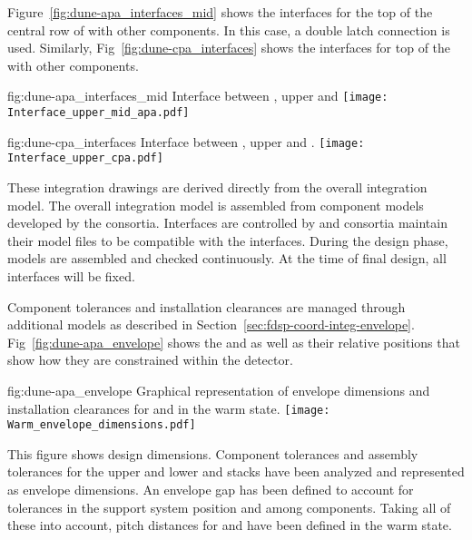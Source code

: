 Figure~\ref{fig:dune-apa_interfaces_mid} shows the interfaces for the
top of the central row of  with other components. In this case, a
double latch connection is used. Similarly,
Fig~\ref{fig:dune-cpa_interfaces} shows the interfaces for top of the
 with other components.
\begin{dunefigure}{fig:dune-apa_interfaces_mid}
  {Interface between , upper  and }
  \texttt{[image: Interface\_upper\_mid\_apa.pdf]}
\end{dunefigure}
\begin{dunefigure}
    {fig:dune-cpa_interfaces}
  {Interface between , upper  and .}
  \texttt{[image: Interface\_upper\_cpa.pdf]}
\end{dunefigure}

These integration drawings are derived directly from the overall
integration model. The overall integration model is assembled from
component models developed by the consortia. Interfaces are controlled
by  and consortia maintain their model files to be
compatible with the interfaces. During the design phase, models are
assembled and checked continuously. At the time of final design, all
interfaces will be fixed.


Component tolerances and installation clearances are managed through
additional models as described in
Section~\ref{sec:fdsp-coord-integ-envelope}.
Fig~\ref{fig:dune-apa_envelope} shows the  and
 as well as their relative positions that show how they are
constrained within the detector.
\begin{dunefigure}{fig:dune-apa_envelope} {Graphical
    representation of envelope dimensions and installation clearances
    for  and  in the warm state.}
  \texttt{[image: Warm\_envelope\_dimensions.pdf]}
\end{dunefigure}


This figure shows design dimensions. Component tolerances and assembly
tolerances for the upper and lower  and  stacks
have been analyzed and represented as envelope dimensions. An envelope
gap has been defined to account for tolerances in the support system
position and among components. Taking all of these into account, pitch
distances for  and  have been defined in the
warm state.


